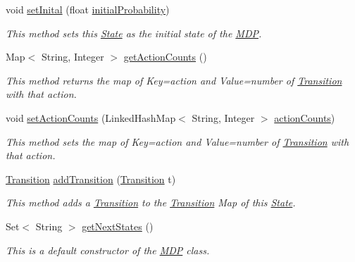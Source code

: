 \begin{DoxyCompactItemize}
void \hyperlink{classmdp_1_1core_1_1_state_ae2b8a26846dfde87eac8dc536b171355}{set\+Inital} (float \hyperlink{classmdp_1_1core_1_1_state_a237d2d5f81db0553a2180cf66a20472b}{initial\+Probability})
\begin{DoxyCompactList}\small\item\em This method sets this \hyperlink{classmdp_1_1core_1_1_state}{State} as the initial state of the \hyperlink{classmdp_1_1core_1_1_m_d_p}{M\+D\+P}. \end{DoxyCompactList}\item 
Map$<$ String, Integer $>$ \hyperlink{classmdp_1_1core_1_1_state_a14947bea4d426d7b8665be0f07ed20c0}{get\+Action\+Counts} ()
\begin{DoxyCompactList}\small\item\em This method returns the map of Key=action and Value=number of \hyperlink{classmdp_1_1core_1_1_transition}{Transition} with that action. \end{DoxyCompactList}\item 
void \hyperlink{classmdp_1_1core_1_1_state_aab391f1b09decdee9e3b74a51ad31520}{set\+Action\+Counts} (Linked\+Hash\+Map$<$ String, Integer $>$ \hyperlink{classmdp_1_1core_1_1_state_a56e17de2fde7a7f4ee8b1491c11438d5}{action\+Counts})
\begin{DoxyCompactList}\small\item\em This method sets the map of Key=action and Value=number of \hyperlink{classmdp_1_1core_1_1_transition}{Transition} with that action. \end{DoxyCompactList}\item 
\hyperlink{classmdp_1_1core_1_1_transition}{Transition} \hyperlink{classmdp_1_1core_1_1_state_acc75ae62e5e0fe543bf49b616f88359c}{add\+Transition} (\hyperlink{classmdp_1_1core_1_1_transition}{Transition} t)
\begin{DoxyCompactList}\small\item\em This method adds a \hyperlink{classmdp_1_1core_1_1_transition}{Transition} to the \hyperlink{classmdp_1_1core_1_1_transition}{Transition} Map of this \hyperlink{classmdp_1_1core_1_1_state}{State}. \end{DoxyCompactList}\item 
Set$<$ String $>$ \hyperlink{classmdp_1_1core_1_1_state_afa42873a5a6554333a18a052ec52f59e}{get\+Next\+States} ()
\begin{DoxyCompactList}\small\item\em This is a default constructor of the \hyperlink{classmdp_1_1core_1_1_m_d_p}{M\+D\+P} class. \end{DoxyCompactList}\item 

\end{DoxyCompactItemize}

